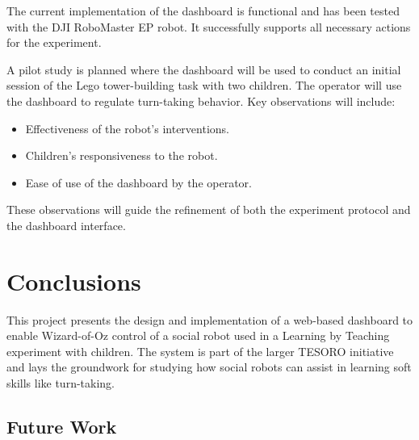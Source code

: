 \documentclass[a4paper]{usiinfbachelorproject}
\begin{document}
The current implementation of the dashboard is functional and has been tested with the DJI RoboMaster EP robot. It successfully supports all necessary actions for the experiment.

A pilot study is planned where the dashboard will be used to conduct an initial session of the Lego tower-building task with two children. The operator will use the dashboard to regulate turn-taking behavior. Key observations will include:
\begin{itemize}
    \item Effectiveness of the robot's interventions.
    \item Children's responsiveness to the robot.
    \item Ease of use of the dashboard by the operator.
\end{itemize}

These observations will guide the refinement of both the experiment protocol and the dashboard interface.



\newpage

\section{\textbf{Conclusions}}\label{sec:conclusions}
This project presents the design and implementation of a web-based dashboard to enable Wizard-of-Oz control of a social robot used in a Learning by Teaching experiment with children. The system is part of the larger TESORO initiative and lays the groundwork for studying how social robots can assist in learning soft skills like turn-taking.

\subsection{\textbf{Future Work}}




\end{document}
